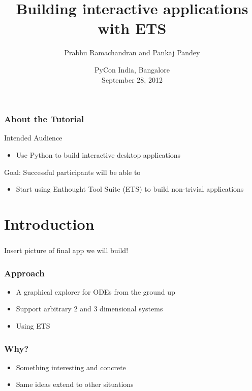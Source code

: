 \documentclass[14pt,compress]{beamer}
\title[ETS]{Building interactive applications with ETS}
\author[Prabhu and Pankaj] {Prabhu Ramachandran and Pankaj Pandey}
\institute[Enthought] {\large \pgfimage[height=3em]{enthought-logo_lg}
}
\date[] {
\small
PyCon India, Bangalore\\
September 28, 2012
}
\begin{document}
\begin{frame}
  \maketitle
\end{frame}


\begin{frame}
  \frametitle{About the Tutorial}
  \begin{block}{Intended Audience}
  \begin{itemize}
    \item Use Python to build interactive desktop applications
  \end{itemize}
  \end{block}  

  \begin{block}{Goal: Successful participants will be able to}
    \begin{itemize}
      \item Start using Enthought Tool Suite (ETS) to build non-trivial applications

    \end{itemize}
  \end{block}
\end{frame}

\section{Introduction}

\begin{frame}
  \frametitle{}
  \begin{center}
      Insert picture of final app we will build!
  \end{center}
\end{frame}

\begin{frame}
  \frametitle{Approach}
  \begin{itemize}
      \item A graphical explorer for ODEs \alert{from the ground up}
  \item Support arbitrary 2 and 3 dimensional systems
  \item Using ETS
 \end{itemize}
\end{frame}

\begin{frame}
  \frametitle{Why?}
  \begin{itemize}
  \item Something interesting and concrete
  \item Same ideas extend to other situations
 \end{itemize}
\end{frame}
\end{document}
